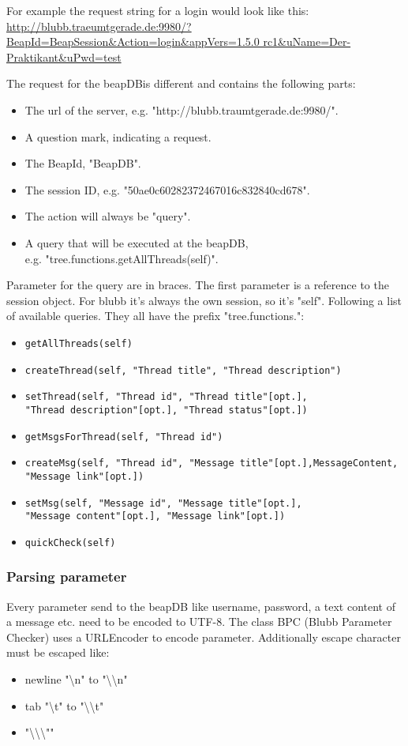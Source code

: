 \documentclass[12pt,a4paper,oneside]{report}
\newcommand{\appname}{blubb}
\newcommand{\beapDB}{beapDB}
\newcommand{\code}[1]{\lstinline{#1}}
\begin{document}
For example the request string for a login would look like this:
\url{http://blubb.traeumtgerade.de:9980/?BeapId=BeapSession&Action=login&appVers=1.5.0 rc1&uName=Der-Praktikant&uPwd=test}

The request for the \beapDB is different and contains the following parts:
\begin{itemize}

\item The url of the server, e.g. "http://blubb.traumtgerade.de:9980/".
\item A question mark, indicating a request.
\item The BeapId, "BeapDB".
\item The session ID, e.g. "50ae0c60282372467016c832840cd678".
\item The action will always be "query".
\item A query that will be executed at the \beapDB{}, \\
e.g. "tree.functions.getAllThreads(self)".
\end{itemize}

Parameter for the query are in braces. The first parameter is a reference to the session object. For \appname{} it's always the own session, so it's "self". 
Following a list of available queries. They all have the prefix  "tree.functions.":
\begin{itemize}
\item{\code{getAllThreads(self)}}
\item{\code{createThread(self, "Thread title", "Thread description")}}
\item{\code{setThread(self, "Thread id", "Thread title"[opt.],}\\
\code{"Thread description"[opt.], "Thread status"[opt.])}}
\item{\code{getMsgsForThread(self, "Thread id")}}
\item{\code{createMsg(self, "Thread id", "Message title"[opt.],MessageContent, "Message link"[opt.])}}
\item{\code{setMsg(self, "Message id", "Message title"[opt.],}\\
\code{"Message content"[opt.], "Message link"[opt.])}}
\item{\code{quickCheck(self)}}
\end{itemize}


 \subsubsection{Parsing parameter}
Every parameter send to the beapDB like username, password, a text content of a message etc. need to be encoded to UTF-8.
The class BPC (Blubb Parameter Checker) uses a URLEncoder to encode parameter. 
Additionally escape character must be escaped like:
\begin{itemize}
\item newline "\textbackslash n" to "\textbackslash \textbackslash n"
\item tab "\textbackslash t" to "\textbackslash \textbackslash t"
\item "\textbackslash \textbackslash \textbackslash ""
\end{itemize}
	
\end{document}
